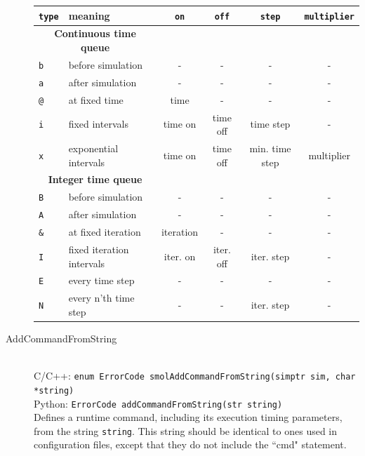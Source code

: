 \documentclass {book}
\newcommand {\ttt} {\texttt}
\begin{document}
\begin{description}
\begin{longtable}[c]{ll|cccc}
\ttt{type} & meaning & \ttt{on} & \ttt{off} & \ttt{step} & \ttt{multiplier}\\
\hline
\multicolumn{2}{c}{\textbf{Continuous time queue}}\\
\ttt{b} & before simulation & - & - & - & -\\
\ttt{a} & after simulation & - & - & - & -\\
\ttt{@} & at fixed time & time & - & - & -\\
\ttt{i} & fixed intervals & time on & time off & time step & -\\
\ttt{x} & exponential intervals & time on & time off & min. time step & multiplier\\
\hline
\multicolumn{2}{c}{\textbf{Integer time queue}}\\
\ttt{B} & before simulation & - & - & - & -\\
\ttt{A} & after simulation & - & - & - & -\\
\ttt{\&} & at fixed iteration & iteration & - & - & -\\
\ttt{I} & fixed iteration intervals & iter. on & iter. off & iter. step & -\\
\ttt{E} & every time step & - & - & - & -\\
\ttt{N} & every n'th time step & - & - & iter. step & -\\
\end{longtable}

\item[AddCommandFromString]
\hfill \\
C/C++: \ttt{enum ErrorCode smolAddCommandFromString(simptr sim, char *string)}\\
Python: \ttt{ErrorCode addCommandFromString(str string)}\\
Defines a runtime command, including its execution timing parameters, from the string \ttt{string}. This string should be identical to ones used in configuration files, except that they do not include the ``cmd" statement.


\end{description}
\end{document}
